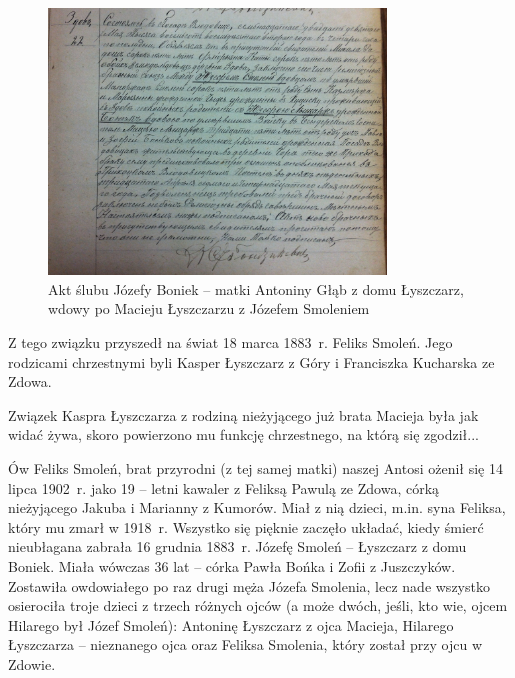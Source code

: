 \begin{figure}[!h]
\begin{center}
\includegraphics[width=0.8\textwidth]{zdjecia/akt_slubu_jozefy_boniek_i_jozefa_smolenia.jpg}
\caption[Akt ślubu Józefy Boniek z Józefem Smoleniem]{Akt ślubu Józefy Boniek -- matki Antoniny Głąb z domu Łyszczarz, wdowy po Macieju Łyszczarzu z Józefem Smoleniem}
\label{rys:akt_slubu_jozefy_boniek_i_jozefa_smolenia}
\end{center}
\end{figure}

Z tego związku przyszedł na świat 18 marca 1883~r. Feliks Smoleń. Jego rodzicami chrzestnymi byli Kasper Łyszczarz z Góry i Franciszka Kucharska ze Zdowa.

Związek Kaspra Łyszczarza z rodziną nieżyjącego już brata Macieja była jak widać żywa, skoro powierzono mu funkcję chrzestnego, na którą się zgodził...

Ów Feliks Smoleń, brat przyrodni (z tej samej matki) naszej Antosi ożenił się 14 lipca 1902~r. jako 19 – letni kawaler z Feliksą Pawulą ze Zdowa, córką nieżyjącego Jakuba i Marianny z Kumorów. Miał z nią dzieci, m.in. syna Feliksa, który mu zmarł w 1918~r.
Wszystko się pięknie zaczęło układać, kiedy śmierć nieubłagana zabrała 16 grudnia 1883~r. Józefę Smoleń -- Łyszczarz z domu Boniek. Miała wówczas 36 lat -- córka Pawła Bońka i Zofii z Juszczyków. Zostawiła owdowiałego po raz drugi męża Józefa Smolenia, lecz nade wszystko osierociła troje dzieci z  trzech różnych ojców (a może dwóch, jeśli, kto wie, ojcem Hilarego był Józef Smoleń): Antoninę Łyszczarz z ojca Macieja, Hilarego Łyszczarza – nieznanego ojca oraz Feliksa Smolenia, który został przy ojcu w Zdowie.


